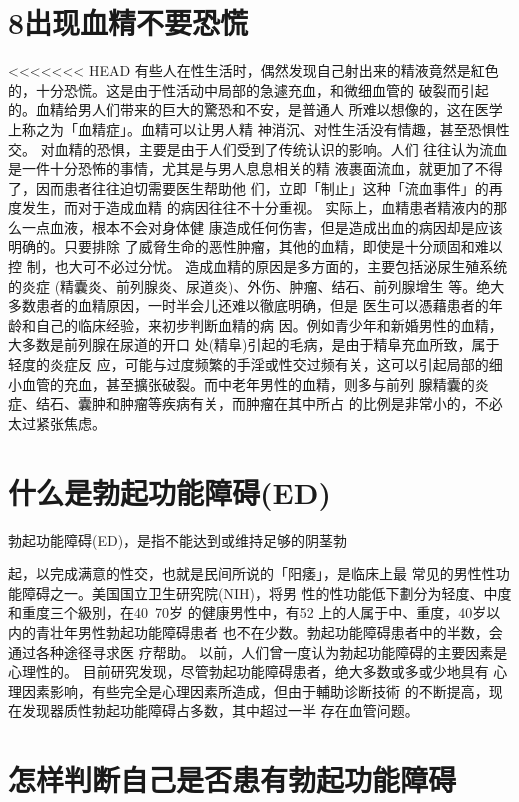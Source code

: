 \documentclass[12pt,UTF8]{ctexbook}
\begin{document}
\section{8出现血精不要恐慌}
<<<<<<< HEAD
有些人在性生活时，偶然发现自己射出来的精液竟然是紅色
的，十分恐慌。这是由于性活动中局部的急遽充血，和微细血管的
破裂而引起的。血精给男人们带来的巨大的驚恐和不安，是普通人
所难以想像的，这在医学上称之为「血精症」。血精可以让男人精
神消沉、对性生活没有情趣，甚至恐惧性交。
对血精的恐惧，主要是由于人们受到了传统认识的影响。人们
往往认为流血是一件十分恐怖的事情，尤其是与男人息息相关的精
液裹面流血，就更加了不得了，因而患者往往迫切需要医生帮助他
们，立即「制止」这种「流血事件」的再度发生，而对于造成血精
的病因往往不十分重视。
实际上，血精患者精液内的那么一点血液，根本不会对身体健
康造成任何伤害，但是造成出血的病因却是应该明确的。只要排除
了威脅生命的恶性肿瘤，其他的血精，即使是十分顽固和难以控
制，也大可不必过分忧。
造成血精的原因是多方面的，主要包括泌尿生殖系统的炎症
(精囊炎、前列腺炎、尿道炎)、外伤、肿瘤、结石、前列腺增生
等。绝大多数患者的血精原因，一时半会儿还难以徹底明确，但是
医生可以憑藉患者的年龄和自己的临床经验，来初步判断血精的病
因。例如青少年和新婚男性的血精，大多数是前列腺在尿道的开口
处(精阜)引起的毛病，是由于精阜充血所致，属于轻度的炎症反
应，可能与过度频繁的手淫或性交过频有关，这可以引起局部的细
小血管的充血，甚至擴张破裂。而中老年男性的血精，则多与前列
腺精囊的炎症、结石、囊肿和肿瘤等疾病有关，而肿瘤在其中所占
的比例是非常小的，不必太过紧张焦虑。
\section{什么是勃起功能障碍(ED)}
勃起功能障碍(ED)，是指不能达到或维持足够的阴茎勃

起，以完成满意的性交，也就是民间所说的「阳痿」，是临床上最
常见的男性性功能障碍之一。美国国立卫生研究院(NIH)，将男
性的性功能低下劃分为轻度、中度和重度三个級別，在40~70岁
的健康男性中，有52%
上的人属于中、重度，40岁以内的青壮年男性勃起功能障碍患者
也不在少数。勃起功能障碍患者中的半数，会通过各种途径寻求医
疗帮助。
以前，人们曾一度认为勃起功能障碍的主要因素是心理性的。
目前研究发现，尽管勃起功能障碍患者，绝大多数或多或少地具有
心理因素影响，有些完全是心理因素所造成，但由于輔助诊断技術
的不断提高，现在发现器质性勃起功能障碍占多数，其中超过一半
存在血管问题。

\section{怎样判断自己是否患有勃起功能障碍}
\end{document}
